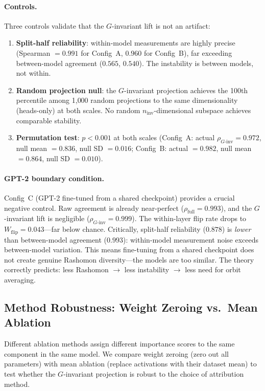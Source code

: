 \documentclass{article}
\begin{document}
\paragraph{Controls.}
Three controls validate that the $G$-invariant lift is not an artifact:
\begin{enumerate}
  \item \textbf{Split-half reliability}: within-model measurements are highly precise (Spearman $= 0.991$ for Config~A, $0.960$ for Config~B), far exceeding between-model agreement ($0.565$, $0.540$). The instability is between models, not within.
  \item \textbf{Random projection null}: the $G$-invariant projection achieves the 100th percentile among 1{,}000 random projections to the same dimensionality (heads-only) at both scales. No random $n_{\text{inv}}$-dimensional subspace achieves comparable stability.
  \item \textbf{Permutation test}: $p < 0.001$ at both scales (Config~A: actual $\rho_{G\text{-inv}} = 0.972$, null mean $= 0.836$, null SD $= 0.016$; Config~B: actual $= 0.982$, null mean $= 0.864$, null SD $= 0.010$).
\end{enumerate}

\paragraph{GPT-2 boundary condition.}
Config~C (GPT-2 fine-tuned from a shared checkpoint) provides a crucial negative control. Raw agreement is already near-perfect ($\rho_{\text{full}} = 0.993$), and the $G$-invariant lift is negligible ($\rho_{G\text{-inv}} = 0.999$). The within-layer flip rate drops to $W_{\text{flip}} = 0.043$---far below chance. Critically, split-half reliability ($0.878$) is \emph{lower} than between-model agreement ($0.993$): within-model measurement noise exceeds between-model variation. This means fine-tuning from a shared checkpoint does not create genuine Rashomon diversity---the models are too similar. The theory correctly predicts: less Rashomon $\to$ less instability $\to$ less need for orbit averaging.

\subsection{Method Robustness: Weight Zeroing vs.\ Mean Ablation}
\label{sec:mean-ablation}

Different ablation methods assign different importance scores to the same component in the same model. We compare weight zeroing (zero out all parameters) with mean ablation (replace activations with their dataset mean) to test whether the $G$-invariant projection is robust to the choice of attribution method.
\end{document}
